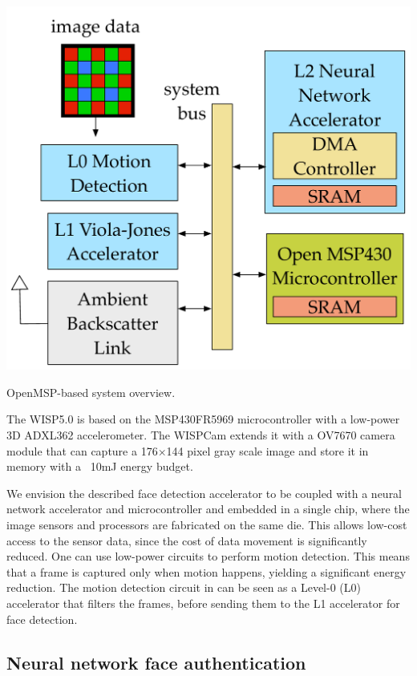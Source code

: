\begin{marginfigure}
  \includegraphics[width=\textwidth]{nsp-figs/system_overview.pdf}
  \caption{OpenMSP-based system overview. }
  \label{fig:OMSP}
\end{marginfigure}


The WISP5.0 is based on the MSP430FR5969 microcontroller with a low-power 3D ADXL362 accelerometer. The WISPCam extends it with a OV7670 camera module that can capture a 176$\times$144 pixel gray scale image and store it in memory with a ~10mJ energy budget.

We envision the described face detection accelerator to be coupled with a neural network accelerator and microcontroller and embedded in a single chip, where the image sensors and processors are fabricated on the same die. This allows low-cost access to the sensor data, since the cost of data movement is significantly reduced. One can use low-power circuits to perform motion detection. This means that a frame is captured only when motion happens, yielding a significant energy reduction. The motion detection circuit in \cite{multipower-isscc13} can be seen as a Level-0 (L0) accelerator that filters the frames, before sending them to the L1 accelerator for face detection.

\subsection{Neural network face authentication}

